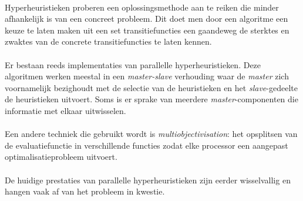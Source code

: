 \paragraph{}
Hyperheuristieken proberen een oplossingsmethode aan te reiken die minder afhankelijk is van een concreet probleem. Dit doet men door een algoritme een keuze te laten maken uit een set transitiefuncties een gaandeweg de sterktes en zwaktes van de concrete transitiefuncties te laten kennen.

\paragraph{}
Er bestaan reeds implementaties van parallelle hyperheuristieken. Deze algoritmen werken meestal in een \emph{master-slave} verhouding waar de \emph{master} zich voornamelijk bezighoudt met de selectie van de heuristieken en het \emph{slave}-gedeelte de heuristieken uitvoert. Soms is er sprake van meerdere \emph{master}-componenten die informatie met elkaar uitwisselen.

\paragraph{}
Een andere techniek die gebruikt wordt is \emph{multiobjectivisation}: het opsplitsen van de evaluatiefunctie in verschillende functies zodat elke processor een aangepast optimalisatieprobleem uitvoert.

\paragraph{}
De huidige prestaties van parallelle hyperheuristieken zijn eerder wisselvallig en hangen vaak af van het probleem in kwestie.

